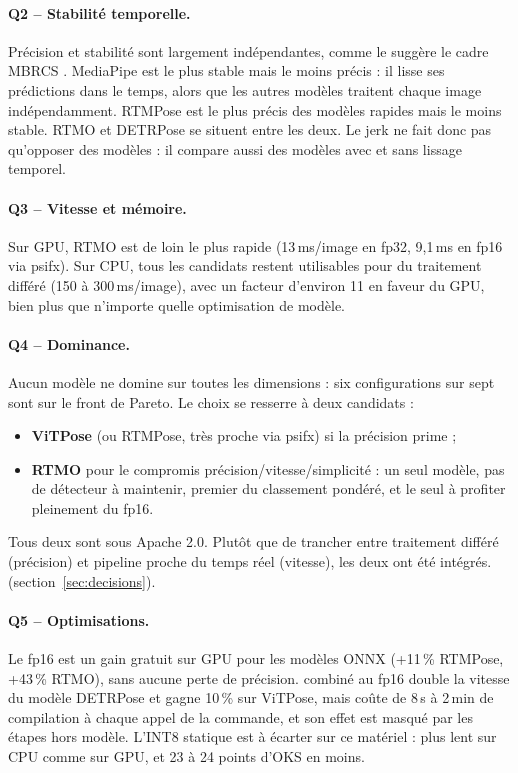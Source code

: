 \documentclass[11pt,a4paper]{report}
\newcommand{\code}[1]{\texttt{\detokenize{#1}}}
\begin{document}
\paragraph{Q2 -- Stabilité temporelle.} Précision et stabilité sont largement indépendantes, comme le suggère le
cadre MBRCS \cite{fernandez2026mbrcs}. MediaPipe est le plus stable mais le moins précis : il lisse ses
prédictions dans le temps, alors que les autres modèles traitent chaque image indépendamment. RTMPose est le plus
précis des modèles rapides mais le moins stable. RTMO et DETRPose se situent entre les deux. Le jerk ne fait donc
pas qu'opposer des modèles : il compare aussi des modèles avec et sans lissage temporel.

\paragraph{Q3 -- Vitesse et mémoire.} Sur GPU, RTMO est de loin le plus rapide (13\,ms/image en fp32, 9,1\,ms en
fp16 via psifx). Sur CPU, tous les candidats restent utilisables pour du traitement différé (150 à 300\,ms/image),
avec un facteur d'environ 11 en faveur du GPU, bien plus que n'importe quelle optimisation de modèle.

\paragraph{Q4 -- Dominance.} Aucun modèle ne domine sur toutes les dimensions : six configurations sur sept sont
sur le front de Pareto. Le choix se resserre à deux candidats :
\begin{itemize}
    \item \textbf{ViTPose} (ou RTMPose, très proche via psifx) si la précision prime ;
    \item \textbf{RTMO} pour le compromis précision/vitesse/simplicité : un seul modèle, pas de détecteur à
    maintenir, premier du classement pondéré, et le seul à profiter pleinement du fp16.
\end{itemize}
Tous deux sont sous Apache 2.0. Plutôt que de trancher entre traitement différé (précision) et pipeline proche du
temps réel (vitesse), les deux ont été intégrés.
(section~\ref{sec:decisions}).

\paragraph{Q5 -- Optimisations.} Le fp16 est un gain gratuit sur GPU pour les modèles ONNX (+11\,\% RTMPose,
+43\,\% RTMO), sans aucune perte de précision. \code{torch.compile} combiné au fp16 double la vitesse du modèle
DETRPose et gagne 10\,\% sur ViTPose, mais coûte de 8\,s à 2\,min de compilation à chaque appel de la commande, et
son effet est masqué par les étapes hors modèle. L'INT8 statique est à écarter sur ce matériel : plus lent sur CPU
comme sur GPU, et 23 à 24 points d'OKS en moins.
\end{document}
